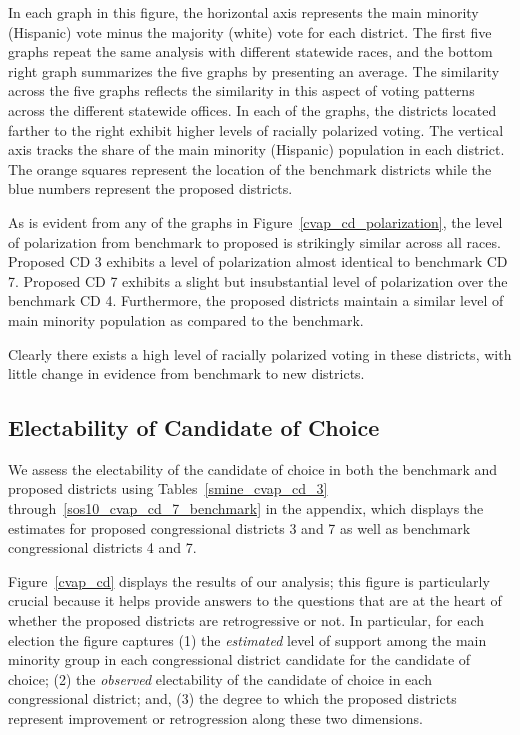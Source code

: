 \documentclass[12pt]{scrartcl}
\begin{document}
In each graph in this figure, the horizontal axis represents the main
minority (Hispanic) vote minus the majority (white) vote for each
district.  The first five graphs repeat the same analysis with
different statewide races, and the bottom right graph summarizes the
five graphs by presenting an average.  The similarity across the five
graphs reflects the similarity in this aspect of voting patterns
across the different statewide offices.  In each of the graphs, the
districts located farther to the right exhibit higher levels of
racially polarized voting. The vertical axis tracks the share of the
main minority (Hispanic) population in each district. The orange
squares represent the location of the benchmark districts while the
blue numbers represent the proposed districts.

As is evident from any of the graphs in
Figure~\ref{cvap_cd_polarization}, the level of polarization from
benchmark to proposed is strikingly similar across all races. Proposed
CD 3 exhibits a level of polarization almost identical to benchmark CD
7. Proposed CD 7 exhibits a slight but insubstantial level of
polarization over the benchmark CD 4.  Furthermore, the proposed
districts maintain a similar level of main minority population as
compared to the benchmark.

Clearly there exists a high level of racially polarized voting in
these districts, with little change in evidence from benchmark to new
districts.

\subsection{Electability of Candidate of Choice}

We assess the electability of the candidate of choice in both the
benchmark and proposed districts using Tables~\ref{smine_cvap_cd_3}
through~\ref{sos10_cvap_cd_7_benchmark} in the appendix, which
displays the estimates for proposed congressional districts 3 and 7 as
well as benchmark congressional districts 4 and 7.

Figure~\ref{cvap_cd} displays the results of our analysis; this figure is particularly crucial because it helps provide answers to the questions that are at the heart of whether the proposed districts are retrogressive or not. In particular, for each election the figure captures (1) the {\it estimated} level of support  among the main minority group in each congressional district candidate for the candidate of choice; (2) the {\it observed} electability of the candidate of choice in each congressional district; and, (3) the degree to which the proposed districts represent improvement or retrogression along these two dimensions.
\end{document}
